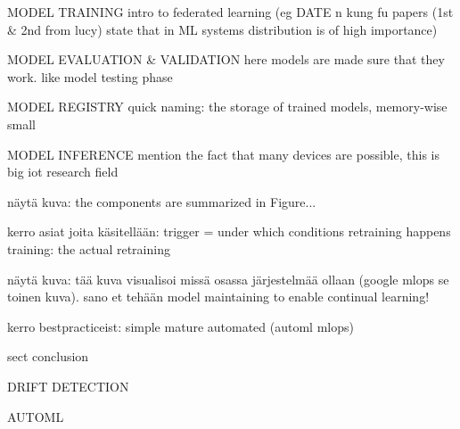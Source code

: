 	MODEL TRAINING
	intro to federated learning
	(eg DATE n kung fu papers (1st & 2nd from lucy) state that in ML systems distribution is of high importance)
	
	MODEL EVALUATION & VALIDATION
	here models are made sure that they work. like model testing phase

	MODEL REGISTRY
	quick naming: the storage of trained models, memory-wise small

	MODEL INFERENCE
	mention the fact that many devices are possible, this is big iot research field

näytä kuva: the components are summarized in Figure...

kerro asiat joita käsitellään: trigger = under which conditions retraining happens
training: the actual retraining

näytä kuva: tää kuva visualisoi missä osassa järjestelmää ollaan (google mlops se toinen kuva). sano et tehään model maintaining to enable continual learning!

kerro bestpracticeist: simple mature automated (automl mlops)

sect conclusion

DRIFT DETECTION


AUTOML



